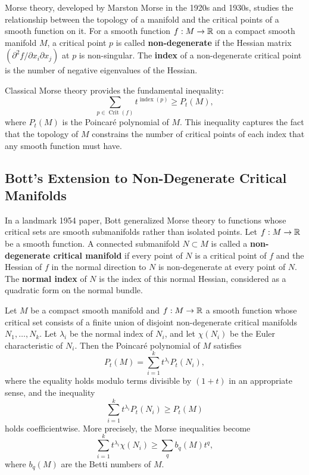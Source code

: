 Morse theory, developed by Marston Morse in the 1920s and 1930s, studies the relationship between the topology of a manifold and the critical points of a smooth function on it. For a smooth function \(f: M \to \mathbb{R}\) on a compact smooth manifold \(M\), a critical point \(p\) is called \textbf{non-degenerate} if the Hessian matrix \((\partial^2 f / \partial x_i \partial x_j)\) at \(p\) is non-singular. The \textbf{index} of a non-degenerate critical point is the number of negative eigenvalues of the Hessian.

Classical Morse theory provides the fundamental inequality:
\[
\sum_{p \in \operatorname{Crit}(f)} t^{\operatorname{index}(p)} \geq P_t(M),
\]
where \(P_t(M)\) is the Poincar\'e polynomial of \(M\). This inequality captures the fact that the topology of \(M\) constrains the number of critical points of each index that any smooth function must have.

\subsection{Bott's Extension to Non-Degenerate Critical Manifolds}

In a landmark 1954 paper, Bott generalized Morse theory to functions whose critical sets are smooth submanifolds rather than isolated points. Let \(f: M \to \mathbb{R}\) be a smooth function. A connected submanifold \(N \subset M\) is called a \textbf{non-degenerate critical manifold} if every point of \(N\) is a critical point of \(f\) and the Hessian of \(f\) in the normal direction to \(N\) is non-degenerate at every point of \(N\). The \textbf{normal index} of \(N\) is the index of this normal Hessian, considered as a quadratic form on the normal bundle.

\begin{theorem}
Let \(M\) be a compact smooth manifold and \(f: M \to \mathbb{R}\) a smooth function whose critical set consists of a finite union of disjoint non-degenerate critical manifolds \(N_1, \dots, N_k\). Let \(\lambda_i\) be the normal index of \(N_i\), and let \(\chi(N_i)\) be the Euler characteristic of \(N_i\). Then the Poincar\'e polynomial of \(M\) satisfies
\[
P_t(M) = \sum_{i=1}^k t^{\lambda_i} P_t(N_i),
\]
where the equality holds modulo terms divisible by \((1+t)\) in an appropriate sense, and the inequality
\[
\sum_{i=1}^k t^{\lambda_i} P_t(N_i) \geq P_t(M)
\]
holds coefficientwise. More precisely, the Morse inequalities become
\[
\sum_{i=1}^k t^{\lambda_i} \chi(N_i) \geq \sum_{q} b_q(M) t^q,
\]
where \(b_q(M)\) are the Betti numbers of \(M\).
\end{theorem}

